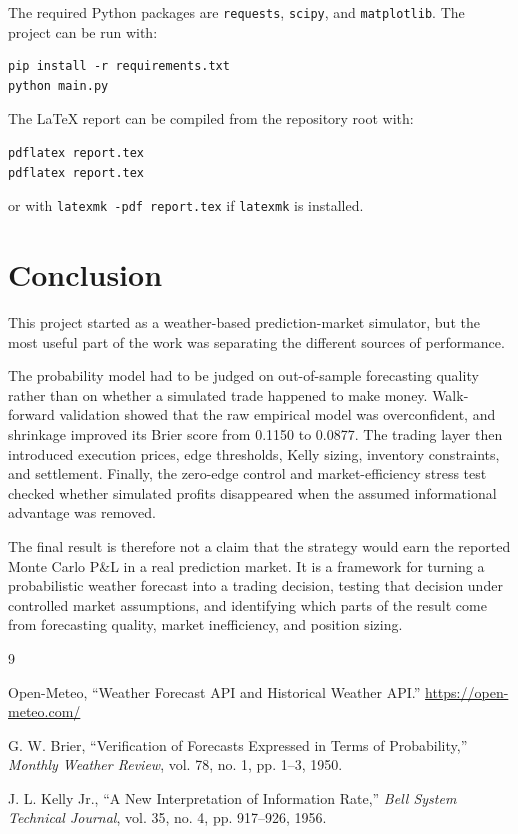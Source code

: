 \documentclass[11pt]{article}
\begin{document}
The required Python packages are \texttt{requests}, \texttt{scipy}, and \texttt{matplotlib}. The project can be run with:

\begin{verbatim}
pip install -r requirements.txt
python main.py
\end{verbatim}

The LaTeX report can be compiled from the repository root with:

\begin{verbatim}
pdflatex report.tex
pdflatex report.tex
\end{verbatim}

or with \texttt{latexmk -pdf report.tex} if \texttt{latexmk} is installed.

\section{Conclusion}

This project started as a weather-based prediction-market simulator, but the most useful part of the work was separating the different sources of performance.

The probability model had to be judged on out-of-sample forecasting quality rather than on whether a simulated trade happened to make money. Walk-forward validation showed that the raw empirical model was overconfident, and shrinkage improved its Brier score from 0.1150 to 0.0877. The trading layer then introduced execution prices, edge thresholds, Kelly sizing, inventory constraints, and settlement. Finally, the zero-edge control and market-efficiency stress test checked whether simulated profits disappeared when the assumed informational advantage was removed.

The final result is therefore not a claim that the strategy would earn the reported Monte Carlo P\&L in a real prediction market. It is a framework for turning a probabilistic weather forecast into a trading decision, testing that decision under controlled market assumptions, and identifying which parts of the result come from forecasting quality, market inefficiency, and position sizing.

\begin{thebibliography}{9}

Open-Meteo, ``Weather Forecast API and Historical Weather API.''
\url{https://open-meteo.com/}

G. W. Brier, ``Verification of Forecasts Expressed in Terms of Probability,'' \emph{Monthly Weather Review}, vol. 78, no. 1, pp. 1--3, 1950.

J. L. Kelly Jr., ``A New Interpretation of Information Rate,'' \emph{Bell System Technical Journal}, vol. 35, no. 4, pp. 917--926, 1956.

\end{thebibliography}
\end{document}
